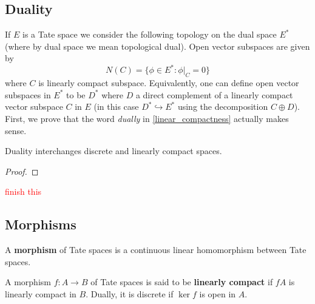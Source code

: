 \subsection*{Duality}
If $E$ is a Tate space we consider the following topology on the dual space $E^{*}$ (where by dual space we mean topological dual). Open vector subspaces are given by
\[
	N(C) = \{\phi\in E^{*} \colon \phi\lvert_{C} = 0\}
\]
where $C$ is linearly compact subspace. Equivalently, one can define open vector subspaces in $E^{*}$ to be $D^{*}$ where $D$ a direct complement of a linearly compact vector subspace $C$ in $E$ (in this case $D^{*} \hookrightarrow E^{*}$ using the decomposition $C\oplus D$).  \\
First, we prove that the word \emph{dually} in \cref{linear_compactness} actually makes sense. 
\begin{proposition}\label{duality-d-lattice-c-lattice}
	Duality interchanges discrete and linearly compact spaces.
\end{proposition}
\begin{proof}
	
\end{proof}
\textcolor{red}{finish this}
\subsection*{Morphisms}
A \textbf{morphism} of Tate spaces is a continuous linear homomorphism between Tate spaces.
\begin{definition}\label{def:linearly-compact-and-discrete-morphisms}
	A morphism $f\colon A\to B$ of Tate spaces is said to be \textbf{linearly compact} if $fA$ is linearly compact in $B$. Dually, it is discrete if $\ker f$ is open in $A$.

\end{definition}

